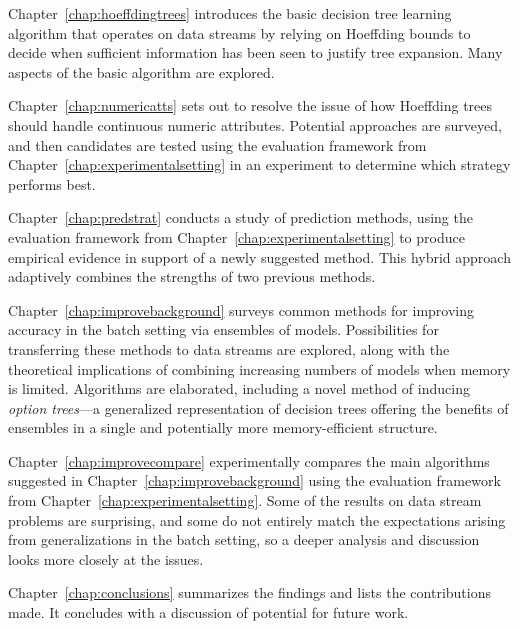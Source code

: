 Chapter~\ref{chap:hoeffdingtrees} introduces the basic decision tree learning algorithm that operates on data streams by relying on Hoeffding bounds to decide when sufficient information has been seen to justify tree expansion. Many aspects of the basic algorithm are explored.

Chapter~\ref{chap:numericatts} sets out to resolve the issue of how Hoeffding trees should handle continuous numeric attributes. Potential approaches are surveyed, and then candidates are tested using the evaluation framework from Chapter~\ref{chap:experimentalsetting} in an experiment to determine which strategy performs best.

Chapter~\ref{chap:predstrat} conducts a study of prediction methods, using the evaluation framework from Chapter~\ref{chap:experimentalsetting} to produce empirical evidence in support of a newly suggested method. This hybrid approach adaptively combines the strengths of two previous methods.

Chapter~\ref{chap:improvebackground} surveys common methods for improving accuracy in the batch setting via ensembles of models. Possibilities for transferring these methods to data streams are explored, along with the theoretical implications of combining increasing numbers of models when memory is limited. Algorithms are elaborated, including a novel method of inducing {\em option trees}---a generalized representation of decision trees offering the benefits of ensembles in a single and potentially more memory-efficient structure.

Chapter~\ref{chap:improvecompare} experimentally compares the main algorithms suggested in Chapter~\ref{chap:improvebackground} using the evaluation framework from Chapter~\ref{chap:experimentalsetting}. Some of the results on data stream problems are surprising, and some do not entirely match the expectations arising from generalizations in the batch setting, so a deeper analysis and discussion looks more closely at the issues.

Chapter~\ref{chap:conclusions} summarizes the findings and lists the contributions made. It concludes with a discussion of potential for future work.
\ENDOMIT


